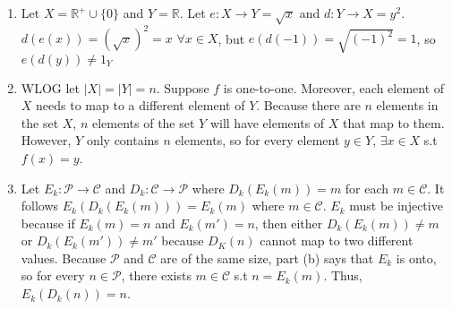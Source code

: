 \documentclass[10pt]{article}
\begin{document}
\begin{enumerate}[label=\arabic*.]
\begin{enumerate}
        \item Let $X=\mathbb{R}^+\cup\{0\}$ and $Y=\mathbb{R}$. Let $e:X\rightarrow Y=\sqrt{x}$ and $d:Y\rightarrow X=y^2$. $d(e(x))={(\sqrt{x})}^2=x$ $\forall x\in X$, but $e(d(-1))=\sqrt{{(-1)}^2}=1$, so $e(d(y))\neq 1_Y$
        \item WLOG let $\lvert X\rvert=\lvert Y\rvert=n$. 
        Suppose $f$ is one-to-one. 
        Moreover, each element of $X$ needs to map to a different element of $Y$. 
        Because there are $n$ elements in the set $X$, $n$ elements of the set $Y$ will have elements of $X$ that map to them. 
        However, $Y$ only contains $n$ elements, so for every element $y\in Y$, $\exists x\in X$ s.t $f(x)=y$.
        \item Let $E_k:\mathcal{P}\rightarrow \mathcal{C}$ and $D_k:\mathcal{C}\rightarrow \mathcal{P}$ where $D_k(E_k(m))=m$ for each $m\in\mathcal{C}$. 
        It follows $E_k(D_k(E_k(m)))=E_k(m)$ where $m\in\mathcal{C}$. 
        $E_k$ must be injective because if $E_k(m)=n$ and $E_k(m')=n$, then either $D_k(E_k(m))\neq m$ or $D_k(E_k(m'))\neq m'$ because $D_K(n)$ cannot map to two different values.
        Because $\mathcal{P}$ and $\mathcal{C}$ are of the same size, part (b) says that $E_k$ is onto, so for every $n\in\mathcal{P}$, there exists $m\in\mathcal{C}$ s.t $n=E_k(m)$.
        Thus, $E_k(D_k(n))=n$.
    \end{enumerate}
\end{enumerate}
\end{document}
